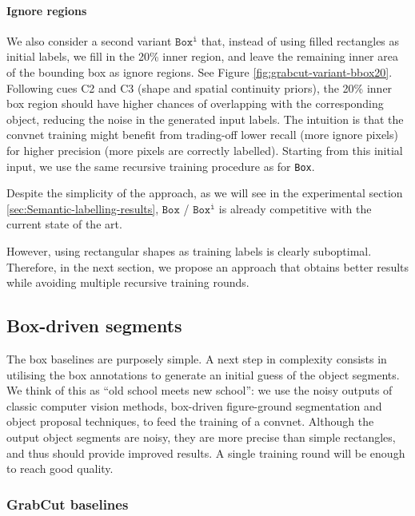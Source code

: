 \documentclass[10pt,english,british,twocolumn]{article}
\begin{document}
\paragraph{Ignore regions}

We also consider a second variant $\mathtt{Box^{i}}$ that, instead
of using filled rectangles as initial labels, we fill in the 20\%
inner region, and leave the remaining inner area of the bounding box
as ignore regions. See Figure \ref{fig:grabcut-variant-bbox20}. Following
cues C2 and C3 (shape and spatial continuity priors), the 20\% inner
box region should have higher chances of overlapping with the corresponding
object, reducing the noise in the generated input labels. The intuition
is that the convnet training might benefit from trading-off lower
recall (more ignore pixels) for higher precision (more pixels are
correctly labelled). Starting from this initial input, we use the
same recursive training procedure as for \texttt{Box}.

Despite the simplicity of the approach, as we will see in the experimental
section \ref{sec:Semantic-labelling-results}, $\mathtt{Box}$ / $\mathtt{Box^{i}}$
is already competitive with the current state of the art.

However, using rectangular shapes as training labels is clearly suboptimal.
Therefore, in the next section, we propose an approach that obtains
better results while avoiding multiple recursive training rounds.

\subsection{\label{subsec:GrabCut-baselines}Box-driven segments}

The box baselines are purposely simple. A next step in complexity
consists in utilising the box annotations to generate an initial guess
of the object segments. We think of this as ``old school meets new
school'': we use the noisy outputs of classic computer vision methods,
box-driven figure-ground segmentation \cite{Rother2004TogGrabcut}
and object proposal \cite{PontTuset2015Iccv} techniques, to feed
the training of a convnet. Although the output object segments are
noisy, they are more precise than simple rectangles, and thus should
provide improved results. A single training round will be enough to
reach good quality.

\subsubsection{GrabCut baselines}
\end{document}
